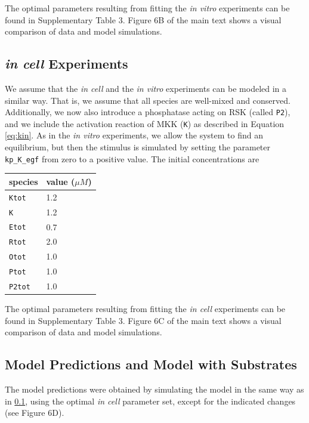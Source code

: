 \documentclass[12pt]{article}
\begin{document}
	The optimal parameters resulting from fitting the \emph{in vitro}
	experiments can be found in Supplementary Table 3. Figure 6B of the
	main text shows a visual comparison of data and model simulations.
	
	\subsection{\textit{in cell} Experiments}
	
	\label{ss:incell} We assume that the \textit{in cell} and the \textit{in
		vitro} experiments can be modeled in a similar way. That is, we assume
	that all species are well-mixed and conserved. Additionally, we now
	also introduce a phosphatase acting on RSK (called \texttt{P2}),
	and we include the activation reaction of MKK (\texttt{K}) as described
	in Equation \eqref{eq:kin}. As in the \textit{in vitro} experiments,
	we allow the system to find an equilibrium, but then the stimulus
	is simulated by setting the parameter \texttt{kp\_K\_egf}
	from zero to a positive value. The initial concentrations are 
	\begin{center}
		\begin{tabular}{ll}
			species  & value ($\mu M$)\\
			\midrule 
			\texttt{Ktot}  & 1.2\\
			\texttt{K}  & 1.2 \\
			\texttt{Etot}  & 0.7\\
			\texttt{Rtot}  & 2.0\\			
			\texttt{Otot}  & 1.0\\
			\texttt{Ptot}  & 1.0\\
			\texttt{P2tot}  & 1.0\\
		\end{tabular}
		\par\end{center}
	
	The optimal parameters resulting from fitting the \emph{in cell} experiments can be found in Supplementary Table 3. Figure 6C of the main text shows a visual comparison of data and model simulations.
	
	\subsection{Model Predictions and Model with Substrates}
	
	The model predictions were obtained by simulating the model in the
	same way as in \ref{ss:incell}, using the optimal \emph{in cell}
	parameter set, except for the indicated changes (see Figure 6D).
	
\end{document}

